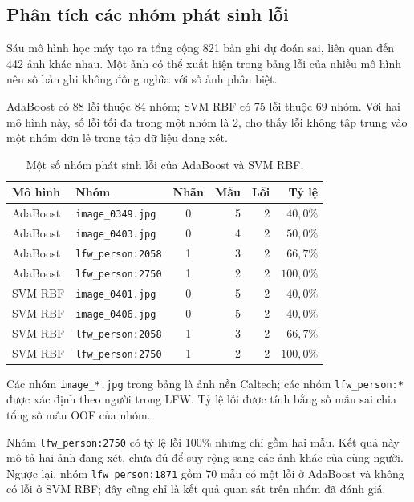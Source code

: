 \documentclass[12pt,a4paper,oneside]{report}
\begin{document}
\subsection{Phân tích các nhóm phát sinh lỗi}

Sáu mô hình học máy tạo ra tổng cộng 821 bản ghi
dự đoán sai, liên quan đến 442 ảnh khác nhau.
Một ảnh có thể xuất hiện trong bảng lỗi của nhiều
mô hình nên số bản ghi không đồng nghĩa với
số ảnh phân biệt.

AdaBoost có 88 lỗi thuộc 84 nhóm; SVM RBF có 75 lỗi
thuộc 69 nhóm. Với hai mô hình này, số lỗi tối đa
trong một nhóm là 2, cho thấy lỗi không tập trung
vào một nhóm đơn lẻ trong tập dữ liệu đang xét.

\begin{table}[htbp]
    \centering
    \small
    \caption{Một số nhóm phát sinh lỗi của
    AdaBoost và SVM RBF.}
    \label{tab:error_groups}
    \begin{tabular}{llcrrr}
        \toprule
        \textbf{Mô hình}
        & \textbf{Nhóm}
        & \textbf{Nhãn}
        & \textbf{Mẫu}
        & \textbf{Lỗi}
        & \textbf{Tỷ lệ} \\
        \midrule
        AdaBoost & \texttt{image\_0349.jpg}
        & 0 & 5 & 2 & $40{,}0\%$ \\
        AdaBoost & \texttt{image\_0403.jpg}
        & 0 & 4 & 2 & $50{,}0\%$ \\
        AdaBoost & \texttt{lfw\_person:2058}
        & 1 & 3 & 2 & $66{,}7\%$ \\
        AdaBoost & \texttt{lfw\_person:2750}
        & 1 & 2 & 2 & $100{,}0\%$ \\
        \midrule
        SVM RBF & \texttt{image\_0401.jpg}
        & 0 & 5 & 2 & $40{,}0\%$ \\
        SVM RBF & \texttt{image\_0406.jpg}
        & 0 & 5 & 2 & $40{,}0\%$ \\
        SVM RBF & \texttt{lfw\_person:2058}
        & 1 & 3 & 2 & $66{,}7\%$ \\
        SVM RBF & \texttt{lfw\_person:2750}
        & 1 & 2 & 2 & $100{,}0\%$ \\
        \bottomrule
    \end{tabular}
\end{table}

Các nhóm \texttt{image\_*.jpg} trong bảng là ảnh nền
Caltech; các nhóm \texttt{lfw\_person:*} được xác định
theo người trong LFW. Tỷ lệ lỗi được tính bằng
số mẫu sai chia tổng số mẫu OOF của nhóm.

Nhóm \texttt{lfw\_person:2750} có tỷ lệ lỗi 100\%
nhưng chỉ gồm hai mẫu. Kết quả này mô tả hai ảnh
đang xét, chưa đủ để suy rộng sang các ảnh khác
của cùng người. Ngược lại, nhóm
\texttt{lfw\_person:1871} gồm 70 mẫu có một lỗi
ở AdaBoost và không có lỗi ở SVM RBF; đây cũng
chỉ là kết quả quan sát trên nhóm đã đánh giá.
\end{document}
